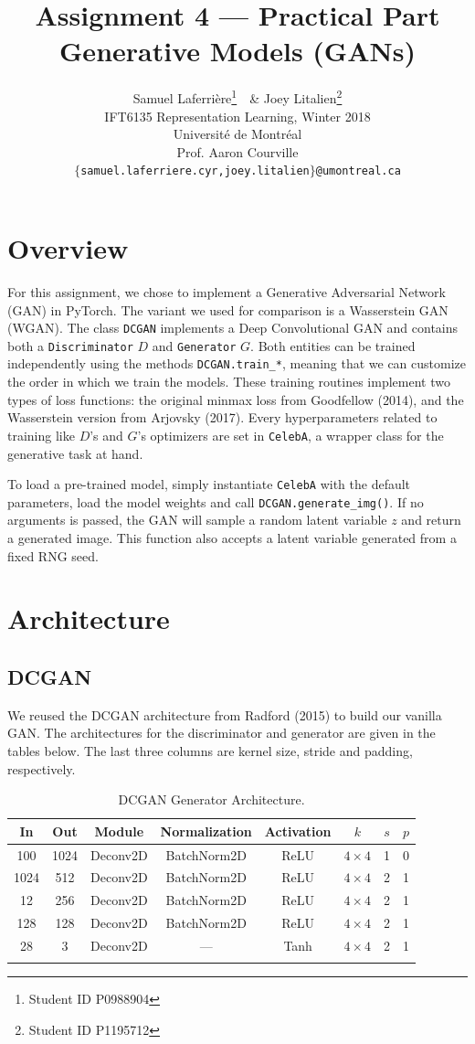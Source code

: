 \documentclass[table]{article}
\title{Assignment 4 --- Practical Part \\
Generative Models (GANs)}
\author{Samuel Laferri\`ere\thanks{Student ID P0988904}\ \, \& Joey Litalien\thanks{Student ID P1195712} \\
IFT6135 Representation Learning, Winter 2018\\
Universit\'e de Montr\'eal\\
Prof. Aaron Courville \\
\texttt{$\{$samuel.laferriere.cyr,joey.litalien$\}$@umontreal.ca}}
\newcommand{\code}[1]{{\color{Blue}\small\texttt{#1}}}
\begin{document}
\maketitle
\thispagestyle{empty}

\section{Overview}

For this assignment, we chose to implement a Generative Adversarial Network (GAN) in PyTorch. The variant we used for comparison is a Wasserstein GAN (WGAN). The class \code{DCGAN} implements a Deep Convolutional GAN and contains both a \code{Discriminator} $D$ and \code{Generator} $G$. Both entities can be trained independently using the methods \code{DCGAN.train\_*}, meaning that we can customize the order in which we train the models. These training routines implement two types of loss functions: the original minmax loss from Goodfellow (2014), and the Wasserstein version from Arjovsky (2017). Every hyperparameters related to training like $D$'s and $G$'s optimizers are set in \code{CelebA}, a wrapper class for the generative task at hand.

To load a pre-trained model, simply instantiate \code{CelebA} with the default parameters, load the model weights and call \code{DCGAN.generate\_img()}. If no arguments is passed, the GAN will sample a random latent variable $z$ and return a generated image. This function also accepts a latent variable generated from a fixed RNG seed.

\section{Architecture}
\subsection{DCGAN}

We reused the DCGAN architecture from Radford (2015) to build our vanilla GAN. The architectures for the discriminator and generator are given in the tables below. The last three columns are kernel size, stride and padding, respectively.

\begin{table}[ht]
\centering
\begin{tabular}{c c ccc c c c}
\Xhline{2\arrayrulewidth}
In & Out & Module & Normalization & Activation & $k$ & $s$ & $p$ \\
\hline
100 & 1024 &Deconv2D & BatchNorm2D & ReLU & $4 \times 4$ & 1 & 0 \\
1024 & 512 &Deconv2D & BatchNorm2D & ReLU & $4 \times 4$ & 2 & 1 \\
12 & 256 &Deconv2D & BatchNorm2D & ReLU & $4 \times 4$ & 2 & 1 \\
128 & 128 &Deconv2D & BatchNorm2D & ReLU & $4 \times 4$ & 2 & 1 \\
28 & 3 &Deconv2D & --- & Tanh & $4 \times 4$ & 2 & 1 \\
\Xhline{2\arrayrulewidth}
\end{tabular}
\caption{DCGAN Generator Architecture.}
\end{table}
\end{document}

